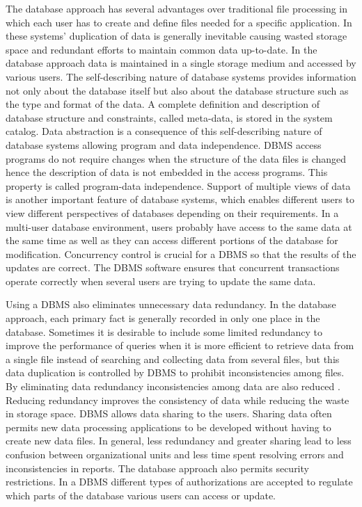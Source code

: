 The database approach has several advantages over traditional file processing in
which each user has to create and define files needed for a specific
application. In these systems' duplication of data is generally inevitable
causing wasted storage space and redundant efforts to maintain common data
up-to-date. In the database approach data is maintained in a single storage
medium and accessed by various users. The self-describing nature of database
systems provides information not only about the database itself but also about
the database structure such as the type and format of the data. A complete
definition and description of database structure and constraints, called
meta-data, is stored in the system catalog. Data abstraction is a consequence of
this self-describing nature of database systems allowing program and data
independence. DBMS access programs do not require changes when the structure of
the data files is changed hence the description of data is not embedded in the
access programs. This property is called program-data independence. Support of
multiple views of data is another important feature of database systems, which
enables different users to view different perspectives of databases depending on
their requirements. In a multi-user database environment, users probably have
access to the same data at the same time as well as they can access different
portions of the database for modification. Concurrency control is crucial for a
DBMS so that the results of the updates are correct. The DBMS software ensures
that concurrent transactions operate correctly when several users are trying to
update the same data.

Using a DBMS also eliminates unnecessary data redundancy. In the database
approach, each primary fact is generally recorded in only one place in the
database. Sometimes it is desirable to include some limited redundancy to
improve the performance of queries when it is more efficient to retrieve data
from a single file instead of searching and collecting data from several files,
but this data duplication is controlled by DBMS to prohibit inconsistencies
among files. By eliminating data redundancy inconsistencies among data are also
reduced \cite{elmasri1998}. Reducing redundancy improves the consistency of data
while reducing the waste in storage space. DBMS allows data sharing to the
users. Sharing data often permits new data processing applications to be
developed without having to create new data files. In general, less redundancy
and greater sharing lead to less confusion between organizational units and less
time spent resolving errors and inconsistencies in reports. The database
approach also permits security restrictions. In a DBMS different types of
authorizations are accepted to regulate which parts of the database various
users can access or update.